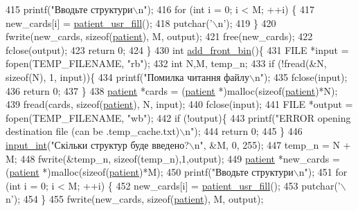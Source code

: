 \begin{DoxyCodeInclude}
{{{{{415     printf(\textcolor{stringliteral}{"Вводьте структури\(\backslash\)n"});
416     \textcolor{keywordflow}{for} (\textcolor{keywordtype}{int} i = 0; i < M; ++i) \{
417         new\_cards[i] = \hyperlink{main_8c_a582ffa97511f52032c2d36314db2a774}{patient\_usr\_fill}();
418         putchar(\textcolor{charliteral}{'\(\backslash\)n'});
419     \}
420     fwrite(new\_cards, \textcolor{keyword}{sizeof}(\hyperlink{structpatient__struct}{patient}), M, output);
421     free(new\_cards);
422     fclose(output);
423     \textcolor{keywordflow}{return} 0;
424 \}
430 \textcolor{keywordtype}{int} \hyperlink{main_8c_ab15bf3ab548bb875cba6b67d6d7a4cc4}{add\_front\_bin}()\{
431     FILE *input = fopen(TEMP\_FILENAME, \textcolor{stringliteral}{"rb"});
432     \textcolor{keywordtype}{int} N,M, temp\_n;
433     \textcolor{keywordflow}{if} (!fread(&N, \textcolor{keyword}{sizeof}(N), 1, input))\{
434         printf(\textcolor{stringliteral}{"Помилка читання файлу\(\backslash\)n"});
435         fclose(input);
436         \textcolor{keywordflow}{return} 0;
437     \}
438     \hyperlink{structpatient__struct}{patient} *cards = (\hyperlink{structpatient__struct}{patient} *)malloc(\textcolor{keyword}{sizeof}(\hyperlink{structpatient__struct}{patient})*N);
439     fread(cards, \textcolor{keyword}{sizeof}(\hyperlink{structpatient__struct}{patient}), N, input);
440     fclose(input);
441     FILE *output = fopen(TEMP\_FILENAME, \textcolor{stringliteral}{"wb"});
442     \textcolor{keywordflow}{if} (!output)\{
443         printf(\textcolor{stringliteral}{"ERROR opening destination file (can be .temp\_cache.txt)\(\backslash\)n"});
444         \textcolor{keywordflow}{return} 0;
445     \}
446     \hyperlink{lab__functions_8h_a6f453bc035d85e967bd5032eca31a155}{input\_int}(\textcolor{stringliteral}{"Скільки структур буде введено?\(\backslash\)n"}, &M, 0, 255);
447     temp\_n = N + M;
448     fwrite(&temp\_n, \textcolor{keyword}{sizeof}(temp\_n),1,output);
449     \hyperlink{structpatient__struct}{patient} *new\_cards = (\hyperlink{structpatient__struct}{patient} *)malloc(\textcolor{keyword}{sizeof}(\hyperlink{structpatient__struct}{patient})*M);
450     printf(\textcolor{stringliteral}{"Вводьте структури\(\backslash\)n"});
451     \textcolor{keywordflow}{for} (\textcolor{keywordtype}{int} i = 0; i < M; ++i) \{
452         new\_cards[i] = \hyperlink{main_8c_a582ffa97511f52032c2d36314db2a774}{patient\_usr\_fill}();
453         putchar(\textcolor{charliteral}{'\(\backslash\)n'});
454     \}
455     fwrite(new\_cards, \textcolor{keyword}{sizeof}(\hyperlink{structpatient__struct}{patient}), M, output);
}}}}}
\end{DoxyCodeInclude}
